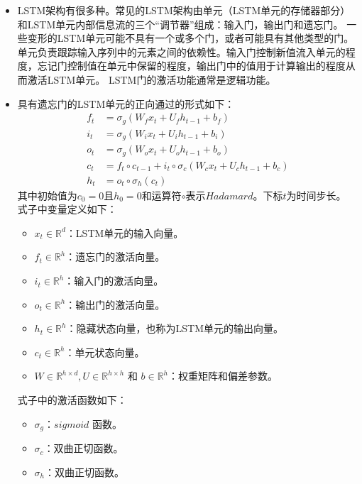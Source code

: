 \begin{itemize}
  \item LSTM架构有很多种。常见的LSTM架构由单元（LSTM单元的存储器部分）和LSTM单元内部信息流的三个“调节器”组成：输入门，输出门和遗忘门。 一些变形的LSTM单元可能不具有一个或多个门，或者可能具有其他类型的门。单元负责跟踪输入序列中的元素之间的依赖性。输入门控制新值流入单元的程度，忘记门控制值在单元中保留的程度，输出门中的值用于计算输出的程度从而激活LSTM单元。 LSTM门的激活功能通常是逻辑功能。
  \item 具有遗忘门的LSTM单元的正向通过的形式如下：
  \begin{equation}
    \begin{aligned} f_{t} &=\sigma_{g}\left(W_{f} x_{t}+U_{f} h_{t-1}+b_{f}\right) \\ i_{t} &=\sigma_{g}\left(W_{i} x_{t}+U_{i} h_{t-1}+b_{i}\right) \\ o_{t} &=\sigma_{g}\left(W_{o} x_{t}+U_{o} h_{t-1}+b_{o}\right) \\ c_{t} &=f_{t} \circ c_{t-1}+i_{t} \circ \sigma_{c}\left(W_{c} x_{t}+U_{c} h_{t-1}+b_{c}\right) \\ h_{t} &=o_{t} \circ \sigma_{h}\left(c_{t}\right) \end{aligned}
  \end{equation}其中初始值为$c_ {0} = 0$且$h_ {0} = 0$和运算符$\circ$表示$Hadamard$。下标$t$为时间步长。
  式子中变量定义如下：
  \begin{itemize}
    \item $x_{t} \in \mathbb{R}^{d}$：LSTM单元的输入向量。
    \item $f_{t} \in \mathbb{R}^{h}$：遗忘门的激活向量。
    \item $i_{t} \in \mathbb{R}^{h}$：输入门的激活向量。
    \item $o_{t} \in \mathbb{R}^{h}$：输出门的激活向量。
    \item $h_{t} \in \mathbb{R}^{h}$：隐藏状态向量，也称为LSTM单元的输出向量。
    \item $c_{t} \in \mathbb{R}^{h}$：单元状态向量。
    \item $W \in \mathbb{R}^{h \times d}, U \in \mathbb{R}^{h \times h}$ 和 $b \in \mathbb{R}^{h}$：权重矩阵和偏差参数。
  \end{itemize}
  式子中的激活函数如下：
  \begin{itemize}
    \item $\sigma_{g}$：$sigmoid$ 函数。
    \item $\sigma_{c}$：双曲正切函数。
    \item $\sigma_{h}$：双曲正切函数。
  \end{itemize}
\end{itemize}
